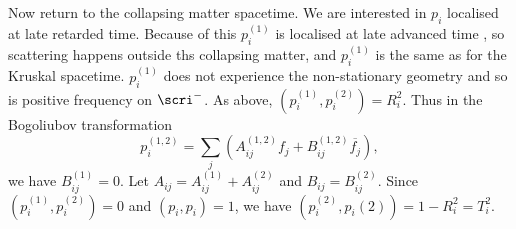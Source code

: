 \documentclass{jknotes}
\begin{document}
\begin{figure}[H]
    \centering
\end{figure}
Now return to the collapsing matter spacetime.
We are interested in \(p_i\) localised at late retarded time. Because of this \(p_i^{(1)}\) is localised at late advanced time \disapprove, so scattering happens outside ths collapsing matter, and \(p_i^{(1)}\) is the same as for the Kruskal spacetime. \(p_i^{(1)}\) does not experience the non-stationary geometry and so is positive frequency on \(\scri^-\). As above, \((p_i^{(1)},p_i^{(2)}) = R_i^2\). Thus in the Bogoliubov transformation
\begin{equation}
    p_i^{(1,2)} = \sum_j\left(A_{ij}^{(1,2)}f_j + B_{ij}^{(1,2)}\overline{f_j}\right),
\end{equation}
we have \(B_{ij}^(1)=0\). Let \(A_{ij} = A_{ij}^{(1)} + A_{ij}^{(2)}\) and \(B_{ij} = B_{ij}^{(2)}\). Since \((p_i^{(1)},p_i^{(2)}) = 0\) and \((p_i,p_i)=1\), we have \((p_i^{(2)},p_i{(2)})=1-R_i^2=T_i^2\).
\end{document}
